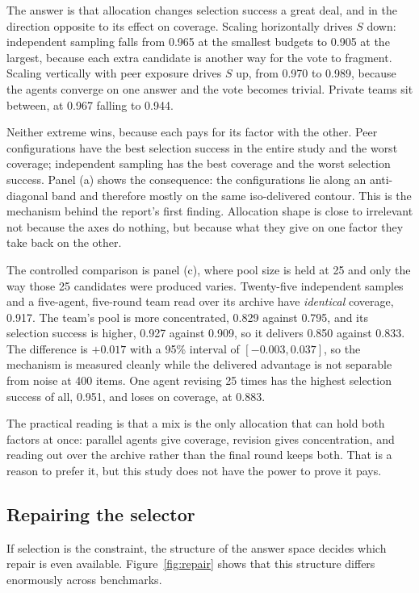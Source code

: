 \documentclass[11pt]{article}
\begin{document}
The answer is that allocation changes selection success a great deal, and in the direction opposite
to its effect on coverage. Scaling horizontally drives $S$ down: independent sampling falls from
0.965 at the smallest budgets to 0.905 at the largest, because each extra candidate is another way
for the vote to fragment. Scaling vertically with peer exposure drives $S$ up, from 0.970 to 0.989,
because the agents converge on one answer and the vote becomes trivial. Private teams sit between,
at 0.967 falling to 0.944.

Neither extreme wins, because each pays for its factor with the other. Peer configurations have the
best selection success in the entire study and the worst coverage; independent sampling has the
best coverage and the worst selection success. Panel (a) shows the consequence: the configurations
lie along an anti-diagonal band and therefore mostly on the same iso-delivered contour. This is the
mechanism behind the report's first finding. Allocation shape is close to irrelevant not because
the axes do nothing, but because what they give on one factor they take back on the other.

The controlled comparison is panel (c), where pool size is held at 25 and only the way those 25
candidates were produced varies. Twenty-five independent samples and a five-agent, five-round team
read over its archive have \emph{identical} coverage, 0.917. The team's pool is more concentrated,
0.829 against 0.795, and its selection success is higher, 0.927 against 0.909, so it delivers 0.850
against 0.833. The difference is $+0.017$ with a 95\% interval of $[-0.003, 0.037]$, so the
mechanism is measured cleanly while the delivered advantage is not separable from noise at 400
items. One agent revising 25 times has the highest selection success of all, 0.951, and loses on
coverage, at 0.883.

The practical reading is that a mix is the only allocation that can hold both factors at once:
parallel agents give coverage, revision gives concentration, and reading out over the archive
rather than the final round keeps both. That is a reason to prefer it, but this study does not
have the power to prove it pays.

\subsection{Repairing the selector}
\label{sec:repair}

If selection is the constraint, the structure of the answer space decides which repair is even
available. Figure~\ref{fig:repair} shows that this structure differs enormously across benchmarks.
\end{document}
